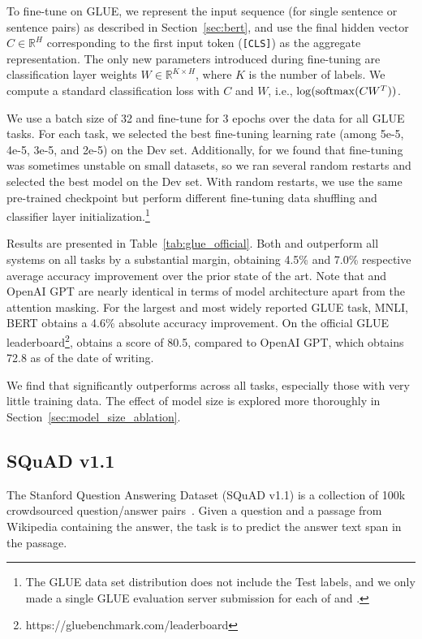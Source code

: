 To fine-tune on GLUE, we represent the input sequence (for single sentence or sentence pairs) as described in Section~\ref{sec:bert}, and use the final hidden vector $C \in \mathbb{R}^{H}$ corresponding to the first input token ({\tt [CLS]}) as the aggregate representation.
The only new parameters introduced during fine-tuning are  classification layer weights $W \in \mathbb{R}^{K \times H}$, where $K$ is the number of labels. We compute a standard classification loss with $C$ and $W$, i.e., $\log({\rm softmax}(CW^T))$.

We use a batch size of 32 and fine-tune for 3 epochs over the data for all GLUE tasks. For each task, we selected the best fine-tuning learning rate (among 5e-5, 4e-5, 3e-5, and 2e-5) on the Dev set. Additionally, for \bertlarge we found that fine-tuning was sometimes unstable on small datasets, so we ran several random restarts and selected the best model on the Dev set. With random restarts, we use the same pre-trained checkpoint but perform different fine-tuning data shuffling and classifier layer initialization.\footnote{The GLUE data set distribution does not include the Test labels, and we only made a single GLUE evaluation server submission for each of \bertbase and \bertlarge.}

Results are presented in Table~\ref{tab:glue_official}. Both \bertbase and \bertlarge outperform all systems on all tasks by a substantial margin, obtaining 4.5\% and 7.0\% respective average accuracy improvement over the prior state of the art. Note that \bertbase and OpenAI GPT are nearly identical in terms of model architecture apart from the attention masking. For the largest and most widely reported GLUE task, MNLI, BERT obtains a 4.6\% absolute accuracy improvement. On the official GLUE leaderboard\footnote{https://gluebenchmark.com/leaderboard},
\bertlarge obtains a score of 80.5, compared to OpenAI GPT, which obtains 72.8 as of the date of writing.

We find that \bertlarge significantly outperforms \bertbase across all tasks, especially those with very little training data. The effect of model size is explored more thoroughly in Section~\ref{sec:model_size_ablation}.

\subsection{SQuAD v1.1}
\label{sec:squad}

The Stanford Question Answering Dataset (SQuAD v1.1) is a collection of 100k crowdsourced question/answer pairs~\cite{rajpurkar-etal:2016:_squad}. Given a question and a passage from Wikipedia containing the answer, the task is to predict the answer text span in the passage. 

